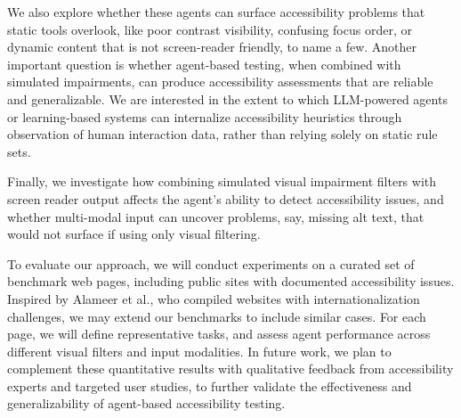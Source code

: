We also explore whether these agents can surface accessibility problems that static tools overlook, like poor contrast visibility, confusing focus order, or dynamic content that is not screen-reader friendly, to name a few. Another important question is whether agent-based testing, when combined with simulated impairments, can produce accessibility assessments that are reliable and generalizable. We are interested in the extent to which LLM-powered agents or learning-based systems can internalize accessibility heuristics through observation of human interaction data, rather than relying solely on static rule sets.

Finally, we investigate how combining simulated visual impairment filters with screen reader output affects the agent's ability to detect accessibility issues, and whether multi-modal input can uncover problems, say, missing alt text, that would not surface if using only visual filtering.


To evaluate our approach, we will conduct experiments on a curated set of benchmark web pages, including public sites with documented accessibility issues. Inspired by Alameer et al.\cite{alameer2016detecting}, who compiled websites with internationalization challenges, we may extend our benchmarks to include similar cases. For each page, we will define representative tasks, and assess agent performance across different visual filters and input modalities. In future work, we plan to complement these quantitative results with qualitative feedback from accessibility experts and targeted user studies, to further validate the effectiveness and generalizability of agent-based accessibility testing.


